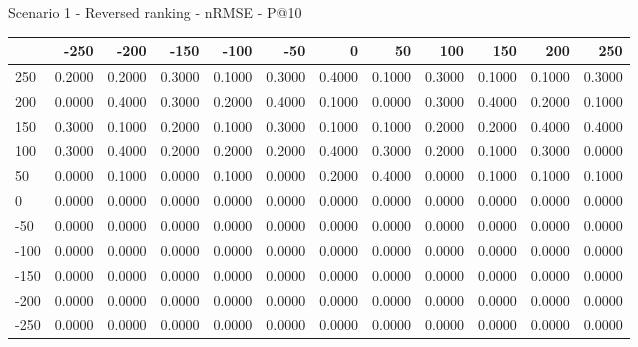 Scenario 1 - Reversed ranking - nRMSE - P@10
\begin{tabular}{lrrrrrrrrrrr}
\toprule
{} &   -250 &   -200 &   -150 &   -100 &   -50  &    0   &    50  &    100 &    150 &    200 &    250 \\
\midrule
 250 & 0.2000 & 0.2000 & 0.3000 & 0.1000 & 0.3000 & 0.4000 & 0.1000 & 0.3000 & 0.1000 & 0.1000 & 0.3000 \\
 200 & 0.0000 & 0.4000 & 0.3000 & 0.2000 & 0.4000 & 0.1000 & 0.0000 & 0.3000 & 0.4000 & 0.2000 & 0.1000 \\
 150 & 0.3000 & 0.1000 & 0.2000 & 0.1000 & 0.3000 & 0.1000 & 0.1000 & 0.2000 & 0.2000 & 0.4000 & 0.4000 \\
 100 & 0.3000 & 0.4000 & 0.2000 & 0.2000 & 0.2000 & 0.4000 & 0.3000 & 0.2000 & 0.1000 & 0.3000 & 0.0000 \\
 50  & 0.0000 & 0.1000 & 0.0000 & 0.1000 & 0.0000 & 0.2000 & 0.4000 & 0.0000 & 0.1000 & 0.1000 & 0.1000 \\
 0   & 0.0000 & 0.0000 & 0.0000 & 0.0000 & 0.0000 & 0.0000 & 0.0000 & 0.0000 & 0.0000 & 0.0000 & 0.0000 \\
-50  & 0.0000 & 0.0000 & 0.0000 & 0.0000 & 0.0000 & 0.0000 & 0.0000 & 0.0000 & 0.0000 & 0.0000 & 0.0000 \\
-100 & 0.0000 & 0.0000 & 0.0000 & 0.0000 & 0.0000 & 0.0000 & 0.0000 & 0.0000 & 0.0000 & 0.0000 & 0.0000 \\
-150 & 0.0000 & 0.0000 & 0.0000 & 0.0000 & 0.0000 & 0.0000 & 0.0000 & 0.0000 & 0.0000 & 0.0000 & 0.0000 \\
-200 & 0.0000 & 0.0000 & 0.0000 & 0.0000 & 0.0000 & 0.0000 & 0.0000 & 0.0000 & 0.0000 & 0.0000 & 0.0000 \\
-250 & 0.0000 & 0.0000 & 0.0000 & 0.0000 & 0.0000 & 0.0000 & 0.0000 & 0.0000 & 0.0000 & 0.0000 & 0.0000 \\
\bottomrule
\end{tabular}

